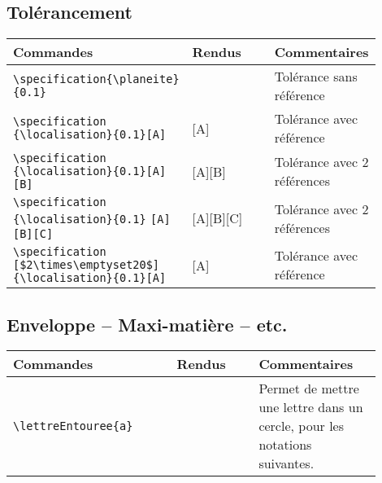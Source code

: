 \documentclass[a4paper,12pt]{article}
\begin{document}
		\subsection{Tolérancement}

			\noindent
			\begin{tabular}{|p{0.4\linewidth}|p{0.3\linewidth}|p{0.2\linewidth}|}
				\hline
					\textbf{Commandes}&\textbf{Rendus}&\textbf{Commentaires}
				\\\hline\hline
					\verb!\specification{\planeite}! \verb!{0.1}!	&	\specification{\planeite}{0.1}	&	Tolérance sans référence
				\\\hline
					\verb!\specification! \verb!{\localisation}{0.1}[A]!	&	\specification{\localisation}{0.1}[A]		&	Tolérance avec référence
				\\\hline
					\verb!\specification! \verb!{\localisation}{0.1}[A][B]!	&	\specification{\localisation}{0.1}[A][B]	&	Tolérance avec 2 références
				\\\hline
					\verb!\specification! \verb!{\localisation}{0.1}! \verb![A][B][C]!	&	\specification{\localisation}{0.1}[A][B][C]	&	Tolérance avec 2 références
				\\\hline
					\verb!\specification! \verb![$2\times\emptyset20$]! \verb!{\localisation}{0.1}[A]!	&	\specification[$2\times\emptyset20$]{\localisation}{0.1}[A]	&	Tolérance avec référence
				\\\hline
			\end{tabular}

		\subsection{Enveloppe -- Maxi-matière -- etc.}

		\noindent
			\begin{tabular}{|p{0.4\linewidth}|p{0.2\linewidth}|p{0.3\linewidth}|}
				\hline
					\textbf{Commandes}&\textbf{Rendus}&\textbf{Commentaires}
				\\\hline\hline
					\verb!\lettreEntouree{a}!	&	{a}	&	Permet de mettre une lettre dans un cercle, pour les notations suivantes.
				\\\hline
			\end{tabular}
		
\end{document}
